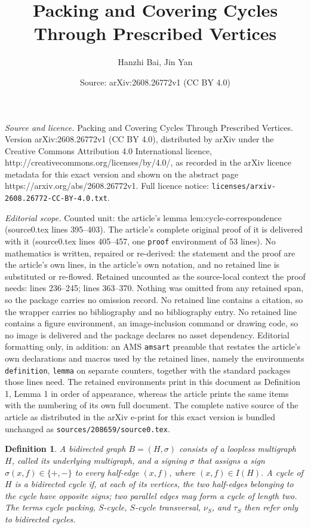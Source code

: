 \documentclass[10pt,a4paper]{amsart}
\title{Packing and Covering Cycles Through Prescribed Vertices}
\author{Hanzhi Bai, Jin Yan}
\date{Source: arXiv:2608.26772v1 (CC BY 4.0)}
\newtheorem{definition}{Definition}
\begin{document}
\maketitle

\noindent\emph{Source and licence.} Packing and Covering Cycles Through Prescribed Vertices. Version arXiv:2608.26772v1 (CC BY 4.0), distributed by arXiv under the Creative Commons Attribution 4.0 International licence, http://creativecommons.org/licenses/by/4.0/, as recorded in the arXiv licence metadata for this exact version and shown on the abstract page https://arxiv.org/abs/2608.26772v1. Full licence notice: \texttt{licenses/arxiv-2608.26772-CC-BY-4.0.txt}.\par\smallskip

\noindent\textit{Editorial scope.} Counted unit: the article's lemma lem:cycle-correspondence (source0.tex lines 395--403). The article's complete original proof of it is delivered with it (source0.tex lines 405--457, one \texttt{proof} environment of 53 lines). No mathematics is written, repaired or re-derived: the statement and the proof are the article's own lines, in the article's own notation, and no retained line is substituted or re-flowed.  Retained uncounted as the source-local context the proof needs: lines 236--245; lines 363--370.  Nothing was omitted from any retained span, so the package carries no omission record.  No retained line contains a citation, so the wrapper carries no bibliography and no bibliography entry.  No retained line contains a figure environment, an image-inclusion command or drawing code, so no image is delivered and the package declares no asset dependency.  Editorial formatting only, in addition: an AMS \texttt{amsart} preamble that restates the article's own declarations and macros used by the retained lines, namely the environments \texttt{definition}, \texttt{lemma} on separate counters, together with the standard packages those lines need.  The retained environments print in this document as Definition 1, Lemma 1 in order of appearance, whereas the article prints the same items with the numbering of its own full document.  The complete native source of the article as distributed in the arXiv e-print for this exact version is bundled unchanged as \texttt{sources/208659/source0.tex}.
\begin{definition}\label{def:bidirected}
A \emph{bidirected graph} $B=(H,\sigma)$ consists of a loopless multigraph
$H$, called its \emph{underlying multigraph}, and a signing $\sigma$ that
assigns a sign $\sigma(x,f)\in\{+,-\}$ to every \emph{half-edge} $(x,f)$,
where $(x,f)\in I(H)$.  A cycle of $H$ is a \emph{bidirected cycle} if, at
each of its vertices, the two half-edges belonging to the cycle have opposite
signs; two parallel edges may form a cycle of length two.  The terms cycle packing, $S$-cycle,
$S$-cycle transversal, $\nu_S$, and $\tau_S$ then refer only to bidirected
cycles.
\end{definition}
\end{document}
